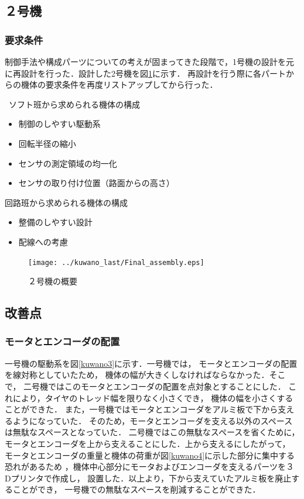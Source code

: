 \documentclass[11pt,a4]{jsarticle}
\begin{document}
\newpage
\subsection{２号機}

\subsubsection{要求条件}
制御手法や構成パーツについての考えが固まってきた段階で，1号機の設計を元に再設計を行った．設計した2号機を図\ref{assembly}に示す．
再設計を行う際に各パートからの機体の要求条件を再度リストアップしてから行った．

\
ソフト班から求められる機体の構成
\begin{itemize}
 \item 制御のしやすい駆動系
 \item 回転半径の縮小
 \item センサの測定領域の均一化
 \item センサの取り付け位置（路面からの高さ）
\end{itemize}

回路班から求められる機体の構成
\begin{itemize}
 \item 整備のしやすい設計
 \item 配線への考慮
\end{itemize}

\begin{figure}[t]
\begin{center}
  \texttt{[image: ../kuwano\_last/Final\_assembly.eps]}
\end{center}
\caption{２号機の概要}
\label{assembly}
\end{figure}

\subsection{改善点}
\subsubsection{モータとエンコーダの配置}
一号機の駆動系を図\ref{kuwano3}に示す．一号機では，
モータとエンコーダの配置を線対称としていたため，
機体の幅が大きくしなければならなかった．そこで，
二号機ではこのモータとエンコーダの配置を点対象とすることにした．
これにより，タイヤのトレッド幅を限りなく小さくでき，
機体の幅を小さくすることができた．
また，一号機ではモータとエンコーダをアルミ板で下から支えるようになっていた．
そのため，モータとエンコーダを支える以外のスペースは無駄なスペースとなっていた．
二号機ではこの無駄なスペースを省くために，
モータとエンコーダを上から支えることにした．上から支えるにしたがって，
モータとエンコーダの重量と機体の荷重が図\ref{kuwano4}に示した部分に集中する恐れがあるため
，機体中心部分にモータおよびエンコーダを支えるパーツを３Dプリンタで作成し，
設置した．以上より，下から支えていたアルミ板を廃止することができ，
一号機での無駄なスペースを削減することができた．
\end{document}
